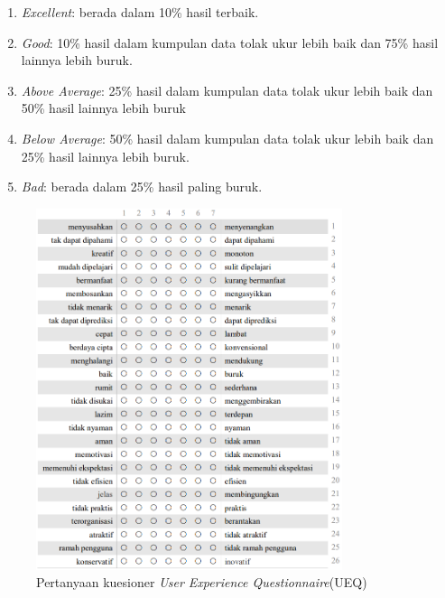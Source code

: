 \begin{enumerate}
	\item \textit{Excellent}: berada dalam 10\% hasil terbaik.
	\item \textit{Good}: 10\% hasil dalam kumpulan data tolak ukur lebih baik dan 75\% hasil lainnya lebih buruk. 
	\item \textit{Above Average}: 25\% hasil dalam kumpulan data tolak ukur lebih baik dan 50\% hasil lainnya lebih buruk 
	\item \textit{Below Average}: 50\% hasil dalam kumpulan data tolak ukur lebih baik dan 25\% hasil lainnya lebih buruk. 
	\item \textit{ Bad}: berada dalam 25\% hasil paling buruk. 
\end{enumerate}
\begin{figure}[H]
	\centering
	\includegraphics[width=0.8\textwidth]{contents/chapter-2/images/UEQ-1.png}
	\caption{Pertanyaan kuesioner \textit{User Experience Questionnaire}(UEQ)}
	\label{Fig:UEQ}
\end{figure}


